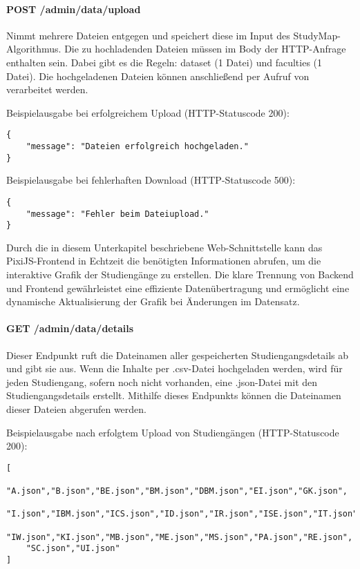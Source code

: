 \paragraph*{POST /admin/data/upload}
\vspace{-1.0em}
Nimmt mehrere Dateien entgegen und speichert diese im Input des StudyMap-Algorithmus. Die zu hochladenden Dateien müssen im Body der HTTP-Anfrage enthalten sein. Dabei gibt es die Regeln: dataset (1 Datei) und faculties (1 Datei). Die hochgeladenen Dateien können anschließend per Aufruf von  verarbeitet werden.

\noindent
Beispielausgabe bei erfolgreichem Upload (HTTP-Statuscode 200):
\begin{lstlisting}[style=Python]
{
    "message": "Dateien erfolgreich hochgeladen."
}
\end{lstlisting}

\noindent
Beispielausgabe bei fehlerhaften Download (HTTP-Statuscode 500):
\begin{lstlisting}[style=Python]
{
    "message": "Fehler beim Dateiupload."
}
\end{lstlisting}

Durch die in diesem Unterkapitel beschriebene Web-Schnittstelle kann das PixiJS-Frontend in Echtzeit die benötigten Informationen abrufen, um die interaktive Grafik der Studiengänge zu erstellen. Die klare Trennung von Backend und Frontend gewährleistet eine effiziente Datenübertragung und ermöglicht eine dynamische Aktualisierung der Grafik bei Änderungen im Datensatz.

\paragraph*{GET /admin/data/details}
\vspace{-1.0em}
Dieser Endpunkt ruft die Dateinamen aller gespeicherten Studiengangsdetails ab und gibt sie aus. Wenn die Inhalte per .csv-Datei hochgeladen werden, wird für jeden Studiengang, sofern noch nicht vorhanden, eine .json-Datei mit den Studiengangsdetails erstellt. Mithilfe dieses Endpunkts können die Dateinamen dieser Dateien abgerufen werden.

\noindent
Beispielausgabe nach erfolgtem Upload von Studiengängen (HTTP-Statuscode 200):
\begin{lstlisting}[style=Python]
[
    "A.json","B.json","BE.json","BM.json","DBM.json","EI.json","GK.json",
    "I.json","IBM.json","ICS.json","ID.json","IR.json","ISE.json","IT.json",
    "IW.json","KI.json","MB.json","ME.json","MS.json","PA.json","RE.json",
    "SC.json","UI.json"
]
\end{lstlisting}

